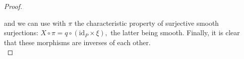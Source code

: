 \begin{proof}
    \begin{center}
    \end{center}
    and we can use with \(\pi\) the characteristic property of surjective smooth surjections: \(X \circ \pi= q \circ (\mathrm{id}_P \times \xi), \) the latter being smooth. Finally, it is clear that these morphisms are inverses of each other. \\  
    

\end{proof}
